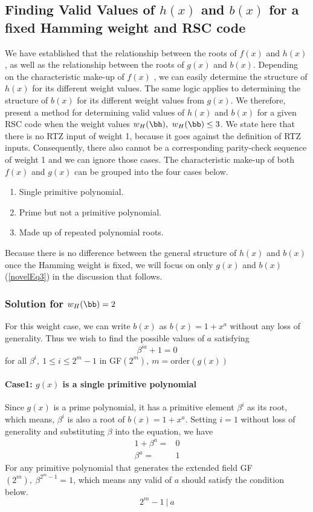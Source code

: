 \subsection{Finding Valid Values of $h(x)$ and $b(x)$ for a fixed Hamming weight and RSC code\newline}
We have established that the relationship between the roots of $f(x)$ and $h(x)$, as well as the relationship between the roots of $g(x)$ and $b(x)$. Depending on the characteristic make-up of $f(x)$ , we can easily determine the structure of $h(x)$ for its different weight values. The same logic applies to determining the structure of $b(x)$ for its different weight values from $g(x)$. 
We therefore, present a method for determining valid values of $h(x)$ and $b(x)$ for a given RSC code when the weight values $w_H(\bh),~w_H(\bb) \leq 3$. We state here that there is no RTZ input of weight 1, because it goes against the definition of RTZ inputs. Consequently, there also cannot be a corresponding parity-check sequence of weight 1 and we can ignore those cases. 
The characteristic make-up of both $f(x)$ and $g(x)$ can be grouped into the four cases below. 
\begin{enumerate}
\item Single primitive polynomial.
\item Prime but not a primitive polynomial.
\item Made up of repeated polynomial roots.
\end{enumerate}
Because there is no difference between the general structure of $h(x)$ and $b(x)$ once the Hamming weight is fixed, we will focus on only $g(x)$ and $b(x)$ (\ref{novelEq3}) in the discussion that follows.
\subsubsection{Solution for $w_H(\bb) =2$}
For this weight case, we can write $b(x)$ as $b(x)=1+x^a$ without any loss of generality. Thus we wish to find the possible values of $a$ satisfying $$\beta^{ia}+1=0$$
for all $\beta^i,~1 \leq i \leq 2^{m}-1$ in GF$(2^{m}),~m=\text{order}(g(x))$
\paragraph{ Case1: $g(x)$ is a single primitive polynomial}
Since $g(x)$ is a prime polynomial, it has a primitive element $\beta^i$ as its root, which means, $\beta^i$ is also a root of $b(x)=1+x^a$. Setting $i=1$ without loss of generality and substituting $\beta$ into the equation, we have 
\begin{equation}
\begin{split}
1+\beta^{a}=&0\\
\beta^a=&1
\end{split}
\end{equation}
For any primitive polynomial that generates the extended field GF$(2^m),~\beta^{2^{m}-1}=1$, 
which means any valid of $a$ should satisfy the condition below.
$$2^{m}-1~|~a$$

